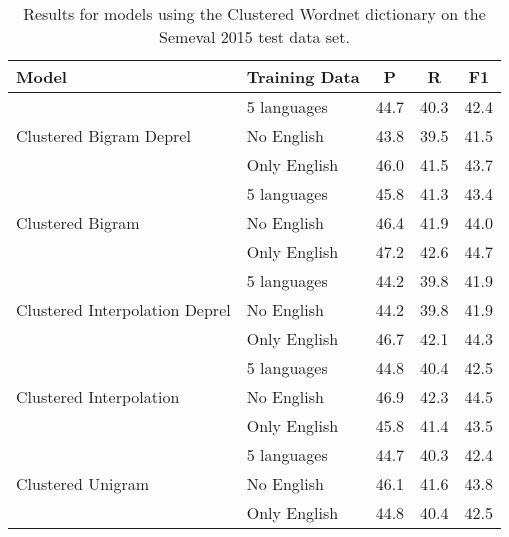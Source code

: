 \begin{table}[]
    \centering
    \begin{tabular}{ll ccc}
\textbf{Model} & \textbf{Training Data} & \textbf{P} & \textbf{R} & \textbf{F1} \\
\hline
\multirow{3}{*}{ Clustered Bigram Deprel } & 5 languages & 44.7 & 40.3 & 42.4 \\
& No English & 43.8 & 39.5 & 41.5 \\
& Only English & 46.0 & 41.5 & 43.7 \\
\hline
\multirow{3}{*}{ Clustered Bigram } & 5 languages & 45.8 & 41.3 & 43.4 \\
& No English & 46.4 & 41.9 & 44.0 \\
& Only English & 47.2 & 42.6 & 44.7 \\
\hline
\multirow{3}{*}{ Clustered Interpolation Deprel } & 5 languages & 44.2 & 39.8 & 41.9 \\
& No English & 44.2 & 39.8 & 41.9 \\
& Only English & 46.7 & 42.1 & 44.3 \\
\hline
\multirow{3}{*}{ Clustered Interpolation } & 5 languages & 44.8 & 40.4 & 42.5 \\
& No English & 46.9 & 42.3 & 44.5 \\
& Only English & 45.8 & 41.4 & 43.5 \\
\hline
\multirow{3}{*}{ Clustered Unigram } & 5 languages & 44.7 & 40.3 & 42.4 \\
& No English & 46.1 & 41.6 & 43.8 \\
& Only English & 44.8 & 40.4 & 42.5 \\
\end{tabular}

    \caption{Results for models using the Clustered Wordnet dictionary on the Semeval 2015 test data set.}
    \label{tab:clust_semeval}
\end{table}
